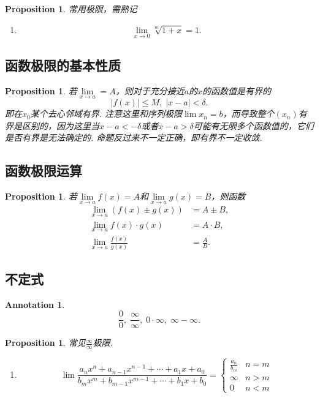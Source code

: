 \documentclass{article}
\newtheorem{proposition}[theorem]{Proposition}
\newtheorem{annotation}[theorem]{Annotation}
\begin{document}
\begin{proposition}
\rm {\color{red}常用极限，需熟记}
\begin{enumerate}
	\item 
	$$
	\lim\limits_{x \rightarrow 0} \sqrt[m]{1+x} = 1.
	$$
\end{enumerate}
\end{proposition}

\subsection{函数极限的基本性质}

\begin{proposition}
\rm 若$\lim\limits_{x \rightarrow a} = A$，则对于充分接近$a$的$x$的函数值是有界的
$$
|f(x)| \leq M ,\; |x-a| < \delta.
$$
即在$x_0$某个去心邻域有界. {\color{blue} 注意这里和序列极限$\lim x_n = b$，而导致整个$(x_n)$有界是区别的，因为这里当$x-a < -\delta$或者$x-a > \delta$可能有无限多个函数值的，它们是否有界是无法确定的}. {\color{red} 命题反过来不一定正确，即有界不一定收敛}.
\end{proposition}

\subsection{函数极限运算}

\begin{proposition}
\rm 若$\lim\limits_{x \rightarrow a} f(x) = A$和$\lim\limits_{x \rightarrow a} g(x) = B$，则函数
$$
\begin{array}{ll}
\lim\limits_{x \rightarrow a} (f(x) \pm  g(x)) &= A \pm B,\\
\lim\limits_{x \rightarrow a} f(x) \cdot g(x) & = A\cdot B, \\
\lim\limits_{x \rightarrow a} \frac{f(x)}{g(x)} &= \frac{A}{B}.
\end{array}
$$
\end{proposition}

\subsection{不定式}

\begin{annotation}
$$
\frac{0}{0},\; \frac{\infty}{\infty},\; 0\cdot \infty,\; \infty-\infty.
$$
\end{annotation}

\begin{proposition}
\rm {\color{red}常见$\frac{\infty}{\infty}$极限}.
\begin{enumerate}
	\item
	$$
		\lim \frac{a_nx^{n} + a_{n-1}x^{n-1} + \cdots + a_1x + a_0}{b_mx^{m} + b_{m-1}x^{m-1} + \cdots + b_1x + b_0} = \left\{ \begin{array}{ll}
		\frac{a_n}{b_m} & n=m \\
		\infty & n > m \\
		0 & n < m 
\end{array} \right.
	$$
\end{enumerate}
\end{proposition}
\end{document}
